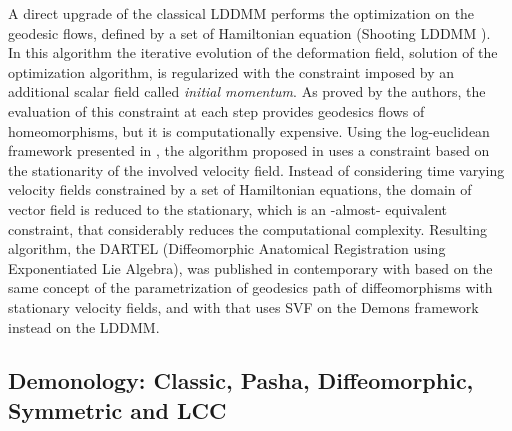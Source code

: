 A direct upgrade of the classical LDDMM performs the optimization on the geodesic flows, defined by a set of Hamiltonian equation (Shooting LDDMM \cite{vialard2012diffeomorphic}). \\
In this algorithm the iterative evolution of the deformation field, solution of the optimization algorithm, is regularized with the constraint imposed by an additional scalar field called \emph{initial momentum}. 
As proved by the authors, the evaluation of this constraint at each step provides geodesics flows of homeomorphisms, but it is computationally expensive. Using the log-euclidean framework presented in \cite{Arsigny:MRM:06}, the algorithm proposed in \cite{Ashburner:07} uses a constraint based on the stationarity of the involved velocity field. Instead of considering time varying velocity fields constrained by a set of Hamiltonian equations, the domain of vector field is reduced to the stationary, which is an -almost- equivalent constraint, that considerably reduces the computational complexity. Resulting algorithm, the DARTEL (Diffeomorphic Anatomical Registration using Exponentiated Lie Algebra), was published in contemporary with \cite{hernandez2007registration} based on the same concept of the parametrization of geodesics path of diffeomorphisms with stationary velocity fields, and with \cite{vercauteren2007non} that uses SVF on the Demons framework instead on the LDDMM.



\subsection{Demonology: Classic, Pasha, Diffeomorphic, Symmetric and LCC}

